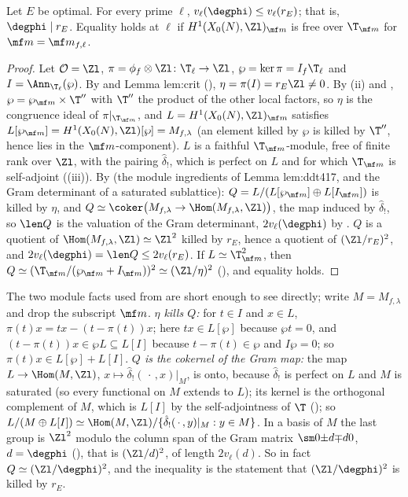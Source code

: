 \begin{corollary}\label{cor:moddeg:ars-divisibility}
Let $E$ be optimal. For every prime $\ell$, $v_\ell(\degphi)\le v_\ell(r_E)$; that is, $\degphi\mid r_E$. Equality holds at $\ell$ if $H^1(X_0(N),\Zl)_{\mf m}$ is free over $\T_{\mf m}$ for $\mf m=\mf m_{f,\ell}$.
\end{corollary}

\begin{proof}
Let $\mathcal O=\Zl$, $\pi=\phi_f\otimes\Zl\colon\T_\ell\to\Zl$, $\wp=\ker\pi=I_f\T_\ell$ and $I=\Ann_{\T_\ell}(\wp)$. By  and Lemma lem:crit (),
$\eta=\pi(I)=r_E\Zl\ne0$. By (ii) and , $\wp=\wp_{\mf m}\times\T''$ with $\T''$ the product of the other local factors, so $\eta$ is the
congruence ideal of $\pi|_{\T_{\mf m}}$, and $L=H^1(X_0(N),\Zl)_{\mf m}$ satisfies $L[\wp_{\mf m}]=H^1(X_0(N),\Zl)[\wp]=M_{f,\lambda}$ (an element killed by $\wp$ is killed by $\T''$, hence lies in the
$\mf m$-component). $L$ is a faithful $\T_{\mf m}$-module, free of finite rank over $\Zl$, with the pairing $\hat\delta_!$, which is perfect on $L$ and for which $\T_{\mf m}$ is self-adjoint
((iii)). By  (the module ingredients of Lemma lem:ddt417, and the Gram determinant of a saturated sublattice):
$Q=L/(L[\wp_{\mf m}]\oplus L[I_{\mf m}])$ is killed by $\eta$, and $Q\simeq\coker\bigl(M_{f,\lambda}\to\Hom(M_{f,\lambda},\Zl)\bigr)$, the map induced by $\hat\delta_!$, so $\len Q$ is the valuation of the Gram
determinant, $2v_\ell(\degphi)$ by . $Q$ is a quotient of $\Hom(M_{f,\lambda},\Zl)\simeq\Zl^2$ killed by $r_E$, hence a quotient of $(\Zl/r_E)^2$, and
$2v_\ell(\degphi)=\len Q\le2v_\ell(r_E)$. If $L\simeq\T_{\mf m}^2$, then $Q\simeq(\T_{\mf m}/(\wp_{\mf m}+I_{\mf m}))^2\simeq(\Zl/\eta)^2$ (), and equality holds.
\end{proof}

The two module facts used from  are short enough to see directly; write $M=M_{f,\lambda}$ and drop the subscript $\mf m$. \emph{$\eta$ kills $Q$:} for $t\in I$ and
$x\in L$, $\pi(t)x=tx-(t-\pi(t))x$; here $tx\in L[\wp]$ because $\wp t=0$, and $(t-\pi(t))x\in\wp L\subseteq L[I]$ because $t-\pi(t)\in\wp$ and $I\wp=0$; so $\pi(t)x\in L[\wp]+L[I]$. \emph{$Q$ is the
cokernel of the Gram map:} the map $L\to\Hom(M,\Zl)$, $x\mapsto\hat\delta_!(\,\cdot\,,x)|_M$, is onto, because $\hat\delta_!$ is perfect on $L$ and $M$ is saturated (so every functional on
$M$ extends to $L$); its kernel is the orthogonal complement of $M$, which is $L[I]$ by the self-adjointness of $\T$ (); so $L/(M\oplus L[I])\simeq\Hom(M,\Zl)/\{\hat\delta_!(\,\cdot\,,y)|_M:y\in M\}$.
In a basis of $M$ the last group is $\Zl^2$ modulo the column span of the Gram matrix $\sm0{\pm d}{\mp d}0$, $d=\degphi$ (), that is $(\Zl/d)^2$, of length
$2v_\ell(d)$. So in fact $Q\simeq(\Zl/\degphi)^2$, and the inequality is the statement that $(\Zl/\degphi)^2$ is killed by $r_E$.

